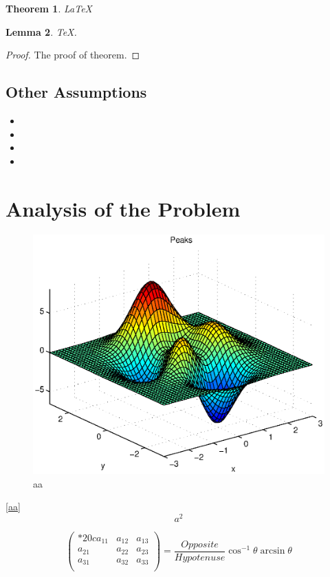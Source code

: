 \documentclass[12pt]{article}
\newtheorem{Theorem}{Theorem}[section]
\newtheorem{Lemma}[Theorem]{Lemma}
\begin{document}
\begin{Theorem} \label{thm:latex}
\LaTeX
\end{Theorem}
\begin{Lemma} \label{thm:tex}
\TeX .
\end{Lemma}
\begin{proof}
The proof of theorem.
\end{proof}

\subsection{Other Assumptions}
\lipsum[6]
\begin{itemize}
\item
\item
\item
\item
\end{itemize}

\lipsum[7]

\section{Analysis of the Problem}
\begin{figure}[h]
\small
\centering
\includegraphics[width=12cm]{mcmthesis-aaa.eps}
\caption{aa} \label{fig:aa}
\end{figure}

\lipsum[8] \eqref{aa}
\begin{equation}
a^2 \label{aa}
\end{equation}

\[
  \begin{pmatrix}{*{20}c}
  {a_{11} } & {a_{12} } & {a_{13} }  \\
  {a_{21} } & {a_{22} } & {a_{23} }  \\
  {a_{31} } & {a_{32} } & {a_{33} }  \\
  \end{pmatrix}
  = \frac{{Opposite}}{{Hypotenuse}}\cos ^{ - 1} \theta \arcsin \theta
\]
\lipsum[9]
\end{document}
